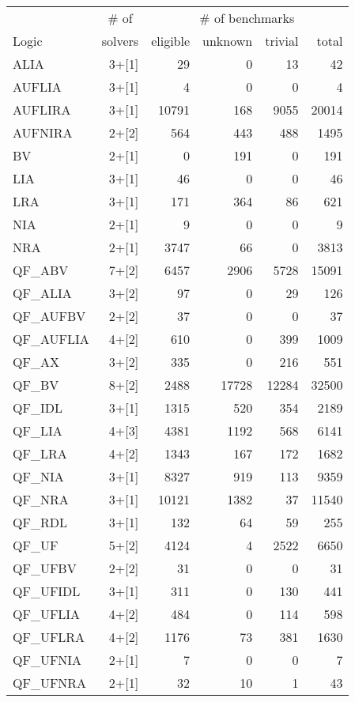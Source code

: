 \documentclass[twosize,11pt]{article}
\begin{document}
\begin{table}
\centering
\begin{tabular}{|l|r|r|r|r|r|}
\hline
       & \multicolumn{1}{|c|}{\# of} & \multicolumn{4}{|c|}{\# of benchmarks} \\
 Logic & solvers & eligible & unknown  & trivial  & total  \\
\hline
ALIA & 3+[1] & 29 & 0 & 13 & 42 \\
AUFLIA & 3+[1] & 4 & 0 & 0 & 4\\
AUFLIRA & 3+[1] & 10791 & 168 & 9055 & 20014 \\
AUFNIRA & 2+[2] & 564 & 443 & 488 & 1495 \\
BV & 2+[1] & 0 & 191 & 0 & 191 \\
LIA & 3+[1] & 46 & 0 & 0 & 46 \\
LRA & 3+[1] & 171 & 364 & 86 & 621\\
NIA & 2+[1] & 9 & 0 & 0 & 9\\
NRA & 2+[1] & 3747 & 66 & 0 & 3813 \\
QF\_ABV & 7+[2] & 6457 & 2906 & 5728 & 15091 \\
QF\_ALIA & 3+[2] & 97 & 0 & 29 & 126 \\
QF\_AUFBV & 2+[2] & 37 & 0 & 0 & 37 \\
QF\_AUFLIA & 4+[2] & 610 & 0 & 399 & 1009\\
QF\_AX & 3+[2] & 335 & 0 & 216 & 551 \\
QF\_BV & 8+[2] & 2488 & 17728 & 12284 & 32500 \\
QF\_IDL & 3+[1] & 1315 & 520 & 354 & 2189 \\
QF\_LIA & 4+[3] & 4381 & 1192 & 568 & 6141 \\
QF\_LRA & 4+[2] & 1343 & 167 & 172 & 1682\\ 
QF\_NIA & 3+[1] & 8327 & 919 & 113 & 9359 \\
QF\_NRA & 3+[1] & 10121 & 1382 & 37 & 11540 \\
QF\_RDL & 3+[1] & 132 & 64 & 59 & 255 \\
QF\_UF & 5+[2] & 4124 & 4 & 2522 & 6650 \\
QF\_UFBV & 2+[2] & 31 & 0 & 0 & 31 \\
QF\_UFIDL & 3+[1] & 311 & 0 & 130 & 441\\
QF\_UFLIA & 4+[2] & 484 & 0 & 114 & 598 \\
QF\_UFLRA & 4+[2] & 1176 & 73 & 381 & 1630 \\
QF\_UFNIA & 2+[1] & 7 & 0 &0 & 7 \\
QF\_UFNRA & 2+[1] & 32 & 10 & 1 & 43\\

\end{tabular}
\end{table}
\end{document}
